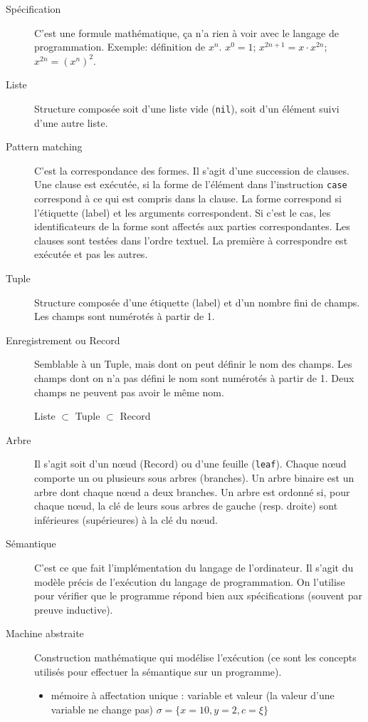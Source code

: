 \begin{description}
  \item[Spécification]
    C'est une formule mathématique,
    ça n'a rien à voir avec le langage de programmation.
    Exemple:
    définition de $x^n$. $x^0=1$; $x^{2n+1}=x\cdot x^{2n}$; $x^{2n} = (x^n)^2$.

  \item[Liste]
    Structure composée soit d'une liste vide (\lstinline|nil|),
    soit d'un élément suivi d'une autre liste.

  \item[Pattern matching]
    C'est la correspondance des formes.
    Il s'agit d'une succession de clauses.
    Une clause est exécutée,
    si la forme de l'élément dans l'instruction \lstinline|case| correspond à
    ce qui est compris dans la clause.
    La forme correspond si l'étiquette (label) et les arguments correspondent.
    Si c'est le cas,
    les identificateurs de la forme sont affectés aux parties correspondantes.
    Les clauses sont testées dans l'ordre textuel.
    La première à correspondre est exécutée et pas les autres.

  \item[Tuple]
    Structure composée d'une étiquette (label) et d'un nombre fini de champs.
    Les champs sont numérotés à partir de 1.

  \item[Enregistrement ou Record]
    Semblable à un Tuple, mais dont on peut définir le nom des champs.
    Les champs dont on n'a pas défini le nom sont numérotés à partir de 1.
    Deux champs ne peuvent pas avoir le même nom.

    Liste $\subset$ Tuple $\subset$ Record

  \item[Arbre]
    Il s'agit soit d'un nœud (Record) ou d'une feuille (\lstinline|leaf|).
    Chaque nœud comporte un ou plusieurs sous arbres (branches).
    Un arbre binaire est un arbre dont chaque nœud a deux branches.
    Un arbre est ordonné si, pour chaque nœud,
    la clé de leurs sous arbres de gauche (resp. droite)
    sont inférieures (supérieures) à la clé du nœud.

  \item[Sémantique]
    C'est ce que fait l'implémentation du langage de l'ordinateur.
    Il s'agit du modèle précis de l'exécution du langage de programmation.
    On l'utilise pour vérifier que le programme répond
    bien aux spécifications (souvent par preuve inductive).

  \item[Machine abstraite]
    Construction mathématique qui modélise l'exécution
    (ce sont les concepts utilisés pour effectuer
    la sémantique sur un programme).
    \begin{itemize}
      \item mémoire à affectation unique : variable et valeur (la valeur d'une variable ne change pas)
        $\sigma = \{ x=10, y=2, c=\xi\}$


\end{itemize}
\end{description}
